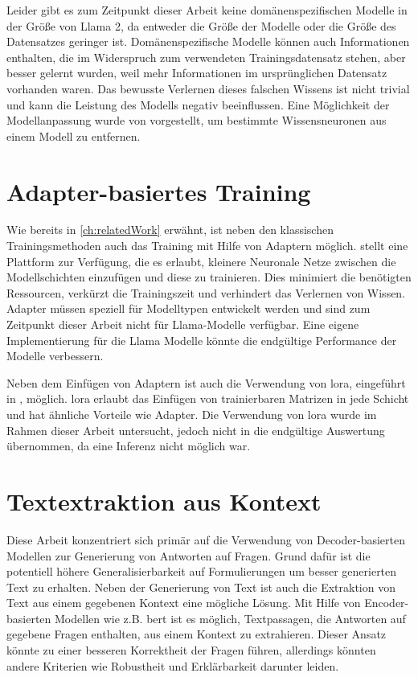 Leider gibt es zum Zeitpunkt dieser Arbeit keine domänenspezifischen Modelle in der Größe von Llama 2, da entweder die Größe der Modelle oder die Größe des Datensatzes geringer ist.
Domänenspezifische Modelle können auch Informationen enthalten, die im Widerspruch zum verwendeten Trainingsdatensatz stehen, aber besser gelernt wurden, weil mehr Informationen im ursprünglichen Datensatz vorhanden waren.
Das bewusste Verlernen dieses falschen Wissens ist nicht trivial und kann die Leistung des Modells negativ beeinflussen.
Eine Möglichkeit der Modellanpassung wurde von \citet{knowledge_neurons} vorgestellt, um bestimmte Wissensneuronen aus einem Modell zu entfernen.

\section{Adapter-basiertes Training}\label{sec:adapter-training}
Wie bereits in \cref{ch:relatedWork} erwähnt, ist neben den klassischen Trainingsmethoden auch das Training mit Hilfe von Adaptern möglich.
\citet{adapterhub} stellt eine Plattform zur Verfügung, die es erlaubt, kleinere Neuronale Netze zwischen die Modellschichten einzufügen und diese zu trainieren.
Dies minimiert die benötigten Ressourcen, verkürzt die Trainingszeit und verhindert das Verlernen von Wissen.
Adapter müssen speziell für Modelltypen entwickelt werden und sind zum Zeitpunkt dieser Arbeit nicht für Llama-Modelle verfügbar.
Eine eigene Implementierung für die Llama Modelle könnte die endgültige Performance der Modelle verbessern.

Neben dem Einfügen von Adaptern ist auch die Verwendung von \ac{lora}, eingeführt in \citet{lora}, möglich.
\ac{lora} erlaubt das Einfügen von trainierbaren Matrizen in jede Schicht und hat ähnliche Vorteile wie Adapter.
Die Verwendung von \ac{lora} wurde im Rahmen dieser Arbeit untersucht, jedoch nicht in die endgültige Auswertung übernommen, da eine Inferenz nicht möglich war.

\section{Textextraktion aus Kontext}
Diese Arbeit konzentriert sich primär auf die Verwendung von Decoder-basierten Modellen zur Generierung von Antworten auf Fragen.
Grund dafür ist die potentiell höhere Generalisierbarkeit auf Formulierungen um besser generierten Text zu erhalten.
Neben der Generierung von Text ist auch die Extraktion von Text aus einem gegebenen Kontext eine mögliche Lösung.
Mit Hilfe von Encoder-basierten Modellen wie z.B. \ac{bert} ist es möglich, Textpassagen, die Antworten auf gegebene Fragen enthalten, aus einem Kontext zu extrahieren.
Dieser Ansatz könnte zu einer besseren Korrektheit der Fragen führen, allerdings könnten andere Kriterien wie Robustheit und Erklärbarkeit darunter leiden.\\

